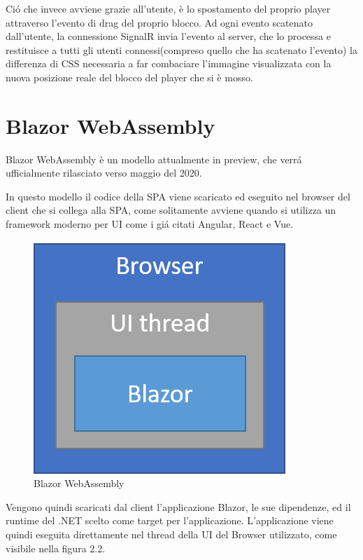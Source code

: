 Ci\'o che invece avviene grazie all'utente, \`e lo spostamento del proprio player attraverso l'evento di drag del proprio blocco.
Ad ogni evento scatenato dall'utente, la connessione SignalR invia l'evento al server, che lo processa e restituisce a tutti gli utenti connessi(compreso quello che ha scatenato l'evento) la differenza di CSS necessaria a far combaciare l'immagine visualizzata con la nuova posizione reale del blocco del player che si \`e mosso.

\pagebreak

\section{Blazor WebAssembly}\label{sez:bwa}
Blazor WebAssembly \`e un modello attualmente in preview, che verr\'a ufficialmente rilasciato verso maggio del 2020.

In questo modello il codice della SPA viene scaricato ed eseguito nel browser del client che si collega alla SPA, come solitamente avviene quando si utilizza un framework moderno per UI come i gi\'a citati Angular, React e Vue.

\begin{figure}[H]
	\centerline{\includegraphics[scale=0.6]{figure/blazor-WebAssembly.png}}
	\caption{Blazor WebAssembly}
	\label{fig:BlazorWebAssembly}
\end{figure}

Vengono quindi scaricati dal client l'applicazione Blazor, le sue dipendenze, ed il runtime del .NET scelto come target per l'applicazione.
L'applicazione viene quindi eseguita direttamente nel thread della UI del Browser utilizzato, come visibile nella figura 2.2.

